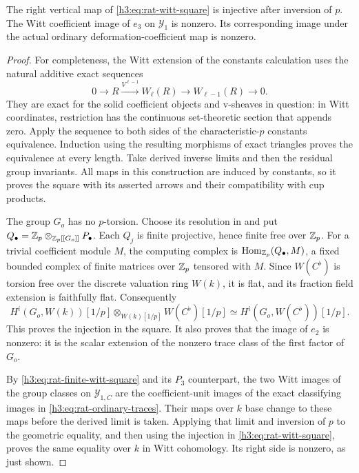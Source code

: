 \begin{lemma}\label{h3:rat:witt-nonvanishing}
The right vertical map of \eqref{h3:eq:rat-witt-square} is injective
after inversion of $p$.  The Witt coefficient image of $e_3$
on $\mathcal Y_1$ is nonzero.  Its corresponding image under
the actual ordinary deformation-coefficient map is nonzero.
\end{lemma}

\begin{proof}
For completeness, the Witt extension of the constants calculation
uses the natural additive exact sequences
\[
 0\longrightarrow R\xrightarrow{V^{\ell-1}}W_\ell(R)
    \longrightarrow W_{\ell-1}(R)\longrightarrow0.
\]
They are exact for the solid coefficient objects and v-sheaves
in question: in Witt coordinates, restriction has the continuous
set-theoretic section that appends zero.  Apply the sequence to
both sides of the characteristic-$p$ constants equivalence.
Induction using the resulting morphisms of exact triangles
proves the equivalence at every length.  Take derived inverse
limits and then the residual group invariants.  All maps in this
construction are induced by constants, so it proves the square
with its asserted arrows and their compatibility with cup products.

The group $G_o$ has no $p$-torsion.  Choose its resolution in
 and put
$Q_\bullet=\mathbb Z_p\otimes_{\mathbb Z_p[[G_o]]}P_\bullet$.
Each $Q_j$ is finite projective, hence finite free over $\mathbb Z_p$.
For a trivial coefficient module $M$, the computing complex is
$\operatorname{Hom}_{\mathbb Z_p}(Q_\bullet,M)$, a fixed bounded complex of finite
matrices over $\mathbb Z_p$ tensored with $M$.
Since $W(C^\flat)$ is torsion free over the discrete valuation
ring $W(k)$, it is flat, and its fraction field extension is
faithfully flat.  Consequently
\[
 H^i(G_o,W(k))[1/p]\otimes_{W(k)[1/p]}W(C^\flat)[1/p]
       \simeq H^i(G_o,W(C^\flat))[1/p].
\]
This proves the injection in the square.  It also proves that
the image of $e_2$ is nonzero: it is the scalar extension of
the nonzero trace class of the first factor of $G_o$.

By \eqref{h3:eq:rat-finite-witt-square} and its $P_3$ counterpart,
the two Witt images of the group classes on $\mathcal Y_{1,C}$ are
the coefficient-unit images of the exact classifying images in
\eqref{h3:eq:rat-ordinary-traces}.  Their maps over $k$ base change
to these maps before the derived limit is taken.  Applying that
limit and inversion of $p$ to the geometric equality, and then
using the injection in \eqref{h3:eq:rat-witt-square}, proves the
same equality over $k$ in Witt cohomology.  Its right side is
nonzero, as just shown.


\end{proof}
